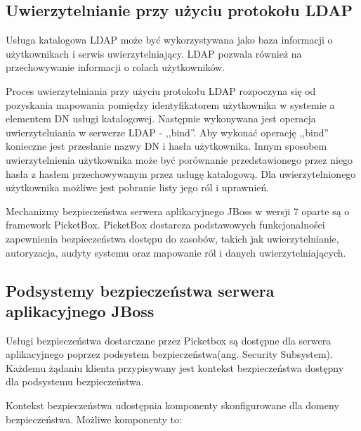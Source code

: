 	\subsection{Uwierzytelnianie przy użyciu protokołu LDAP}

		Usługa katalogowa LDAP może być wykorzystywana jako baza informacji o użytkownikach  i serwis uwierzytelniający. LDAP pozwala również na przechowywanie informacji o rolach użytkowników. 

		Proces uwierzytelniania przy użyciu protokołu LDAP rozpoczyna się od pozyskania mapowania pomiędzy identyfikatorem użytkownika w systemie a elementem DN usługi katalogowej. Następnie wykonywana jest operacja uwierzytelniania w serwerze LDAP - ,,bind''. Aby wykonać operację ,,bind'' konieczne jest przesłanie nazwy DN i hasła użytkownika.  Innym sposobem uwierzytelnienia użytkownika może być porównanie przedstawionego przez niego hasła z hasłem przechowywanym przez usługę katalogową. Dla uwierzytelnionego użytkownika możliwe jest pobranie listy jego ról i uprawnień.


\label{sec:jboss}

	Mechanizmy bezpieczeństwa serwera aplikacyjnego JBoss w wersji 7 oparte są o framework PicketBox. PicketBox dostarcza podstawowych funkcjonalności zapewnienia bezpieczeństwa dostępu do zasobów, takich jak uwierzytelnianie, autoryzacja, audyty systemu oraz mapowanie ról i danych uwierzytelniających. 

	\subsection{Podsystemy bezpieczeństwa serwera aplikacyjnego JBoss}

		Usługi bezpieczeństwa dostarczane przez Picketbox są dostępne dla serwera aplikacyjnego poprzez podsystem bezpieczeństwa(ang. Security Subsystem).  Każdemu żądaniu klienta przypisywany jest kontekst bezpieczeństwa dostępny dla podsystemu bezpieczeństwa\cite{Lofthouse12}. 

		Kontekst bezpieczeństwa udostępnia komponenty skonfigurowane dla domeny bezpieczeństwa. Możliwe komponenty to:

